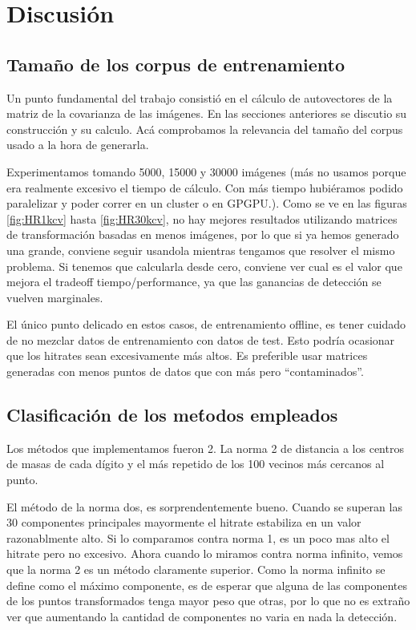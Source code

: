 \section{Discusi\'on}

\subsection{Tama\~no de los corpus de entrenamiento }
Un punto fundamental del trabajo consisti\'o en el c\'alculo de autovectores de la matriz
de la covarianza de las im\'agenes. En las secciones anteriores se discutio su construcci\'on
y su calculo. Ac\'a comprobamos la relevancia del tama\~no del corpus usado a la hora
de generarla.

Experimentamos tomando 5000, 15000 y 30000 im\'agenes (m\'as no usamos porque era
realmente excesivo el tiempo de c\'alculo. Con m\'as tiempo hubi\'eramos podido paralelizar
y poder correr en un cluster o en GPGPU.). Como se ve en las figuras \ref{fig:HR1kcv} hasta \ref{fig:HR30kcv},
no hay mejores resultados utilizando matrices de transformaci\'on basadas en menos im\'agenes, por lo que
si ya hemos generado una grande, conviene seguir usandola mientras tengamos que resolver
el mismo problema. Si tenemos que calcularla desde cero, conviene ver cual es el valor que mejora
el tradeoff tiempo/performance, ya que las ganancias de detecci\'on se vuelven marginales.

El \'unico punto delicado en estos casos, de entrenamiento offline, es tener cuidado
de no mezclar datos de entrenamiento con datos de test. Esto podr\'ia ocasionar que
los hitrates sean excesivamente m\'as altos. Es preferible usar matrices generadas
con menos puntos de datos que con m\'as pero ``contaminados''.


\subsection{Clasificaci\'on de los me\'todos empleados}
Los m\'etodos que implementamos fueron 2. La norma 2 de distancia a
los centros de masas de cada d\'igito y el m\'as repetido de los 100 vecinos m\'as cercanos al punto.

El m\'etodo de la norma dos, es sorprendentemente bueno. Cuando se superan las 30
componentes principales mayormente el hitrate estabiliza en un valor razonablmente alto. Si lo
comparamos contra norma 1, es un poco mas alto el hitrate pero no excesivo. Ahora
cuando lo miramos contra norma infinito, vemos que la norma 2 es un m\'etodo
claramente superior. Como la norma infinito se define como el m\'aximo componente,
es de esperar que alguna de las componentes de los puntos transformados tenga mayor
peso que otras, por lo que no es extra\~no ver que aumentando la cantidad de componentes
no varia en nada la detecci\'on.

